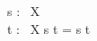 \documentclass[a4paper,10pt,fleqn]{article}
\begin{document}
\begin{zed}
[X]
\end{zed}

\begin{axdef}
s : \seq~X \\
t : \seq~X
\where
s \cat t = s \cat t
\end{axdef}
\end{document}
